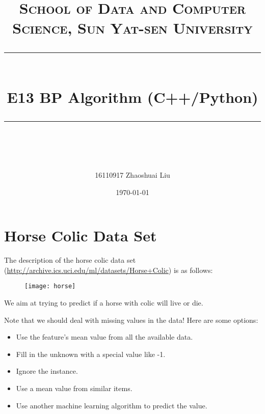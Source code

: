 ﻿\documentclass[a4paper, 11pt]{article}
\title{	
\normalfont \normalsize
\textsc{School of Data and Computer Science, Sun Yat-sen University} \\ [25pt] %
\rule{\textwidth}{0.5pt} \\[0.4cm] %
\huge  E13 BP Algorithm (C++/Python)\\ %
\rule{\textwidth}{2pt} \\[0.5cm] %
\author{16110917 Zhaoshuai Liu}
\date{\normalsize\today}
}
\begin{document}
\maketitle
\tableofcontents
\newpage
\section{Horse Colic Data Set}
The description of the horse colic data set (\url{http://archive.ics.uci.edu/ml/datasets/Horse+Colic}) is as follows:
\begin{figure}[ht]
\centering
\texttt{[image: horse]}
\end{figure}

We aim at trying to predict if a horse with colic will live or die.

Note that we should deal with missing values in the data! Here are some options:
\begin{itemize}
	\item Use the feature’s mean value from all the available data.
	\item Fill in the unknown with a special value like -1.
	\item Ignore the instance.
	\item Use a mean value from similar items.
	\item Use another machine learning algorithm to predict the value.
\end{itemize}
\end{document}
